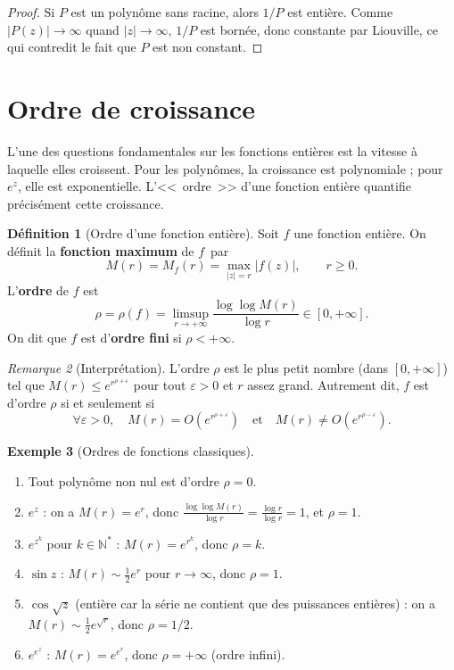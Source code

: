 \documentclass[12pt,a4paper,openany]{book}
\theoremstyle{definition}
\newtheorem{definition}{Définition}[chapter]
\newtheorem{exemple}[definition]{Exemple}
\theoremstyle{plain}
\theoremstyle{remark}
\newtheorem{remarque}[definition]{Remarque}
\newcommand{\N}{\mathbb{N}}
\newcommand{\abs}[1]{\left|#1\right|}
\begin{document}
\begin{proof}
Si $P$ est un polynôme sans racine, alors $1/P$ est entière. Comme
$\abs{P(z)} \to \infty$ quand $\abs{z} \to \infty$, $1/P$ est bornée,
donc constante par Liouville, ce qui contredit le fait que $P$ est non constant.
\end{proof}

\section{Ordre de croissance}\label{sec:ordre-croissance}

L'une des questions fondamentales sur les fonctions entières est la vitesse à
laquelle elles croissent. Pour les polynômes, la croissance est polynomiale ;
pour $e^z$, elle est exponentielle. L'<<~ordre~>> d'une fonction entière
quantifie précisément cette croissance.

\begin{definition}[Ordre d'une fonction entière]\label{def:ordre-entiere}
Soit $f$ une fonction entière. On définit la \textbf{fonction maximum} de $f$~par
\[
  M(r) = M_f(r) = \max_{\abs{z}=r} \abs{f(z)}, \qquad r \geq 0.
\]
L'\textbf{ordre} de $f$ est
\[
  \rho = \rho(f) = \limsup_{r \to +\infty} \frac{\log \log M(r)}{\log r}
  \in [0, +\infty].
\]
On dit que $f$ est d'\textbf{ordre fini} si $\rho < +\infty$.
\end{definition}

\begin{remarque}[Interprétation]\label{rem:ordre-interpretation}
L'ordre $\rho$ est le plus petit nombre (dans $[0,+\infty]$) tel que
$M(r) \leq e^{r^{\rho + \varepsilon}}$ pour tout $\varepsilon > 0$ et $r$
assez grand. Autrement dit, $f$ est d'ordre $\rho$ si et seulement si
\[
  \forall \varepsilon > 0, \quad M(r) = O(e^{r^{\rho+\varepsilon}})
  \quad \text{et} \quad
  M(r) \neq O(e^{r^{\rho-\varepsilon}}).
\]
\end{remarque}

\begin{exemple}[Ordres de fonctions classiques]\label{ex:ordres-classiques}
\begin{enumerate}[label=(\roman*)]
  \item Tout polynôme non nul est d'ordre $\rho = 0$.
  \item $e^z$ : on a $M(r) = e^r$, donc
    $\frac{\log \log M(r)}{\log r} = \frac{\log r}{\log r} = 1$, et $\rho = 1$.
  \item $e^{z^k}$ pour $k \in \N^*$ : $M(r) = e^{r^k}$, donc $\rho = k$.
  \item $\sin z$ : $M(r) \sim \frac{1}{2} e^r$ pour $r \to \infty$, donc $\rho = 1$.
  \item $\cos\!\sqrt{z}$ (entière car la série ne contient que des puissances
    entières) : on a $M(r) \sim \frac{1}{2} e^{\sqrt{r}}$, donc $\rho = 1/2$.
  \item $e^{e^z}$ : $M(r) = e^{e^r}$, donc $\rho = +\infty$ (ordre infini).
\end{enumerate}
\end{exemple}
\end{document}
